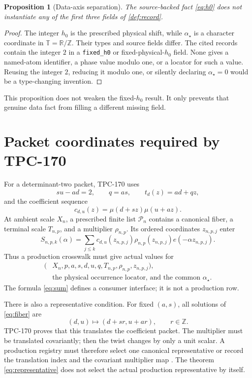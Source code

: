 \documentclass[11pt]{article}
\newtheorem{proposition}[theorem]{Proposition}
\theoremstyle{definition}
\theoremstyle{remark}
\newcommand{\T}{\mathbb T}
\begin{document}
\begin{proposition}[Data-axis separation]
\label{prop:separation}
The source-backed fact \eqref{eq:h0} does not instantiate any of the
first three fields of \cref{def:record}.
\end{proposition}

\begin{proof}
The integer \(h_0\) is the prescribed physical shift, while
\(\alpha_\star\) is a character coordinate in
\(\T=\mathbb R/\mathbb Z\).  Their types and source fields differ.
The cited records contain the integer \(2\) in a
\texttt{fixed\_h0} or fixed-physical-\(h_0\) field.  None gives a
named-atom identifier, a phase value modulo one, or a locator for such
a value.  Reusing the integer \(2\), reducing it modulo one, or
silently declaring \(\alpha_\star=0\) would be a type-changing
invention.
\end{proof}

This proposition does not weaken the fixed-\(h_0\) result.  It only
prevents that genuine data fact from filling a different missing
field.

\section{Packet coordinates required by TPC-170}

For a determinant-two packet, TPC-170 uses
\[
 su-ad=2,\qquad q=as,\qquad
 t_d(z)=ad+qz,
\tag{4}\label{eq:fiber}
\]
and the coefficient sequence
\[
 c_{d,u}(z)=\mu(d+sz)\mu(u+az).
\tag{5}\label{eq:coeff}
\]
At ambient scale \(X_n\), a prescribed finite list
\(\mathcal P_n\) contains a canonical fiber, a terminal scale
\(T_{n,p}\), and a multiplier \(\rho_{n,p}\).  Its ordered
coordinates \(z_{n,p,j}\) enter
\[
 S_{n,p,k}(\alpha)
 =
 \sum_{j\le k}
 c_{d,u}(z_{n,p,j})\rho_{n,p}(z_{n,p,j})
 e(-\alpha z_{n,p,j}).
\tag{6}\label{eq:sum}
\]
Thus a production crosswalk must give actual values for
\[
\begin{split}
(&X_n,p,a,s,d,u,q,T_{n,p},\rho_{n,p},z_{n,p,j}),\\
&\text{the physical occurrence locator, and the common }
\alpha_\star.
\end{split}
\tag{7}\label{eq:coordinates}
\]
The formula \eqref{eq:sum} defines a consumer interface; it is not a
production row.

There is also a representative condition.  For fixed \((a,s)\), all
solutions of \eqref{eq:fiber} are
\[
 (d,u)\longmapsto(d+sr,u+ar),\qquad r\in\mathbb Z.
\tag{8}\label{eq:representative}
\]
TPC-170 proves that this translates the coefficient packet.  The
multiplier must be translated covariantly; then the twist changes by
only a unit scalar.  A production registry must therefore select one
canonical representative or record the translation index and the
covariant multiplier map \citep{WangTPC170}.  The theorem
\eqref{eq:representative} does not select the actual production
representative by itself.
\end{document}
